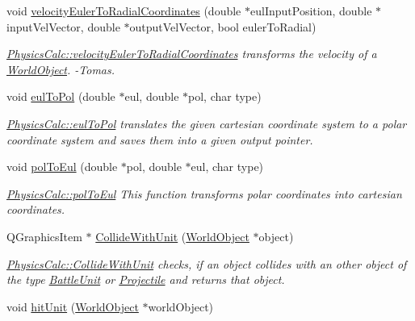\begin{DoxyCompactItemize}
void \hyperlink{class_physics_calc_aae5264bd415c1cccac4bd4628cb015a0}{velocity\+Euler\+To\+Radial\+Coordinates} (double $\ast$eul\+Input\+Position, double $\ast$input\+Vel\+Vector, double $\ast$output\+Vel\+Vector, bool euler\+To\+Radial)
\begin{DoxyCompactList}\small\item\em \hyperlink{class_physics_calc_aae5264bd415c1cccac4bd4628cb015a0}{Physics\+Calc\+::velocity\+Euler\+To\+Radial\+Coordinates} transforms the velocity of a \hyperlink{class_world_object}{World\+Object}. -\/\+Tomas. \end{DoxyCompactList}\item 
void \hyperlink{class_physics_calc_af038d3a5fe0160410456b14601a95581}{eul\+To\+Pol} (double $\ast$eul, double $\ast$pol, char type)
\begin{DoxyCompactList}\small\item\em \hyperlink{class_physics_calc_af038d3a5fe0160410456b14601a95581}{Physics\+Calc\+::eul\+To\+Pol} translates the given cartesian coordinate system to a polar coordinate system and saves them into a given output pointer. \end{DoxyCompactList}\item 
void \hyperlink{class_physics_calc_a441c3e94fe0e6eed1d96531368f50d54}{pol\+To\+Eul} (double $\ast$pol, double $\ast$eul, char type)
\begin{DoxyCompactList}\small\item\em \hyperlink{class_physics_calc_a441c3e94fe0e6eed1d96531368f50d54}{Physics\+Calc\+::pol\+To\+Eul} This function transforms polar coordinates into cartesian coordinates. \end{DoxyCompactList}\item 
Q\+Graphics\+Item $\ast$ \hyperlink{class_physics_calc_ad6d0e0e75ce2a00c15a883531f454233}{Collide\+With\+Unit} (\hyperlink{class_world_object}{World\+Object} $\ast$object)
\begin{DoxyCompactList}\small\item\em \hyperlink{class_physics_calc_ad6d0e0e75ce2a00c15a883531f454233}{Physics\+Calc\+::\+Collide\+With\+Unit} checks, if an object collides with an other object of the type \hyperlink{class_battle_unit}{Battle\+Unit} or \hyperlink{class_projectile}{Projectile} and returns that object. \end{DoxyCompactList}\item 
void \hyperlink{class_physics_calc_a75c4cfbeb112120f4ffd4839182ca25c}{hit\+Unit} (\hyperlink{class_world_object}{World\+Object} $\ast$world\+Object)

\end{DoxyCompactItemize}

